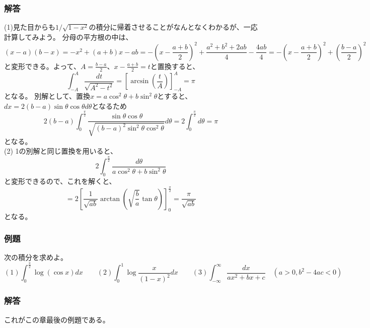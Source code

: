 \documentclass[a4j,dvipdfmx]{jsarticle}
\begin{document}
\subsubsection*{解答}
(1)見た目からも$1/\sqrt{1-x^2}$の積分に帰着させることがなんとなくわかるが、一応計算してみよう。
分母の平方根の中は、
\begin{equation*}
    (x-a)(b-x)=-x^2+(a+b)x-ab=-\left(x-\frac{a+b}{2}\right)^2+\frac{a^2+b^2+2ab}{4}-\frac{4ab}{4}
    =-\left(x-\frac{a+b}{2}\right)^2+\left(\frac{b-a}{2}\right)^2
\end{equation*}
と変形できる。よって、$A=\frac{b-a}{2}$、$x-\frac{a+b}{2}=t$と置換すると、
\begin{equation*}
    \int_{-A}^{A}\frac{dt}{\sqrt{A^2-t^2}}=\left[\arcsin\left(\frac{t}{A}\right)\right]_{-A}^A=\pi
\end{equation*}
となる。
\newpage
別解として、置換$x=a\cos^2\theta+b\sin^2\theta$とすると、$dx=2(b-a)\sin\theta\cos\theta d\theta$となるため
\begin{equation*}
    2(b-a)\int_{0}^{\frac{\pi}{2}}\frac{\sin\theta\cos\theta}{\sqrt{(b-a)^2\sin^2\theta\cos^2\theta}}d\theta=2\int_0^\frac{\pi}{2}d\theta=\pi
\end{equation*}
となる。\\

(2) 1の別解と同じ置換を用いると、
\begin{equation*}
    2\int_0^\frac{\pi}{2}\frac{d\theta}{a\cos^2\theta+b\sin^2\theta}
\end{equation*}
と変形できるので、これを解くと、
\begin{equation*}
    =2\left[\frac{1}{\sqrt{ab}}\arctan\left(\sqrt{\frac{b}{a}}\tan\theta\right)\right]_0^\frac{\pi}{2}=\frac{\pi}{\sqrt{ab}}
\end{equation*}
となる。
\subsubsection*{例題}
次の積分を求めよ。
\begin{equation*}
    (1)\int_0^\frac{\pi}{2}\log(\cos x)dx\qquad(2)\int_0^1 \log\frac{x}{(1-x)^2}dx\qquad(3)\int_{-\infty}^{\infty}\frac{dx}{ax^2+bx+c}\quad(a>0,b^2-4ac<0)
\end{equation*}
\subsubsection*{解答}
これがこの章最後の例題である。
\end{document}
